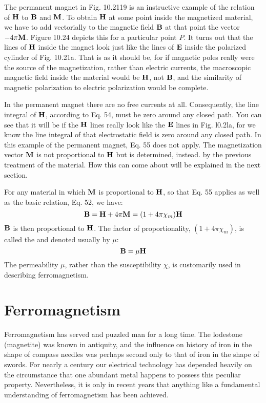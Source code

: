 The permanent magnet in Fig. 10.2119 is an instructive example
of the relation of $\mathbf{H}$ to $\mathbf{B}$ and $\mathbf{M}$. To obtain $\mathbf{H}$ at some point inside
the magnetized material, we have to add vectorially to the magnetic
field $\mathbf{B}$ at that point the vector $-4\pi\mathbf{M}$. Figure 10.24 depicts this
for a particular point $P$. It turns out that the lines of $\mathbf{H}$ inside the
magnet look just like the lines of $\mathbf{E}$ inside the polarized cylinder of
Fig. 10.21a. That is as it should be, for if magnetic poles really were
the source of the magnetization, rather than electric currents, the
macroscopic magnetic field inside the material would be $\mathbf{H}$, not $\mathbf{B}$,
and the similarity of magnetic polarization to electric polarization
would be complete.

In the permanent magnet there are no free currents at all. 
Consequently, the line integral of $\mathbf{H}$, according to Eq. 54, must be zero
around any closed path. You can see that it will be if the $\mathbf{H}$ lines
really look like the $\mathbf{E}$ lines in Fig. l0.2la, for we know the line integral
of that electrostatic field is zero around any closed path. In this
example of the permanent magnet, Eq. 55 does not apply. The
magnetization vector $\mathbf{M}$ is not proportional to $\mathbf{H}$ but is determined,
instead. by the previous treatment of the material. How this can
come about will be explained in the next section.

For any material in which $\mathbf{M}$ is proportional to $\mathbf{H}$, so that Eq. 55
applies as well as the basic relation, Eq. 52, we have:
\begin{equation}
  \mathbf{B} = \mathbf{H}+4\pi\mathbf{M} = (1+4\pi\chi_m)\mathbf{H}
\end{equation}
$\mathbf{B}$ is then proportional to $\mathbf{H}$. The factor of proportionality,
$(1+4\pi\chi_m)$, is called the  and denoted usually
by $\mu$:
\begin{equation}
  \mathbf{B} = \mu\mathbf{H}
\end{equation}
The permeability $\mu$, rather than the susceptibility $\chi$, is customarily
used in describing ferromagnetism.

\iffalse

\section{Ferromagnetism}

Ferromagnetism has served and puzzled man for a long time.
The lodestone (magnetite) was known in antiquity, and the influence
on history of iron in the shape of compass needles was perhaps second
only to that of iron in the shape of swords. For nearly a century
our electrical technology has depended heavily on the circumstance
that one abundant metal happens to possess this peculiar property.
Nevertheless, it is only in recent years that anything like a fundamental
understanding of ferromagnetism has been achieved.

